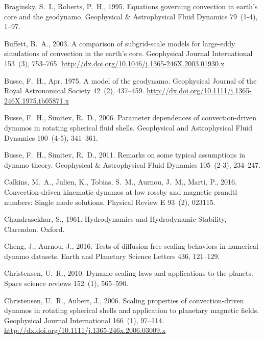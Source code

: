 \documentclass[12pt, a4paper]{article}
\begin{document}
\begin{thebibliography}{73}
Braginsky, S.~I., Roberts, P.~H., 1995. Equations governing convection in
  earth's core and the geodynamo. Geophysical \& Astrophysical Fluid Dynamics
  79~(1-4), 1--97.

Buffett, B.~A., 2003. A comparison of subgrid-scale models for large-eddy
  simulations of convection in the earth's core. Geophysical Journal
  International 153~(3), 753--765.
\newline\urlprefix\url{http://dx.doi.org/10.1046/j.1365-246X.2003.01930.x}

Busse, F.~H., Apr. 1975. A model of the geodynamo. Geophysical Journal of the
  Royal Astronomical Society 42~(2), 437--459.
\newline\urlprefix\url{http://dx.doi.org/10.1111/j.1365-246X.1975.tb05871.x}

Busse, F.~H., Simitev, R.~D., 2006. Parameter dependences of convection-driven
  dynamos in rotating spherical fluid shells. Geophysical and Astrophysical
  Fluid Dynamics 100~(4-5), 341--361.

Busse, F.~H., Simitev, R.~D., 2011. Remarks on some typical assumptions in
  dynamo theory. Geophysical \& Astrophysical Fluid Dynamics 105~(2-3),
  234--247.

Calkins, M.~A., Julien, K., Tobias, S.~M., Aurnou, J.~M., Marti, P., 2016.
  Convection-driven kinematic dynamos at low rossby and magnetic prandtl
  numbers: Single mode solutions. Physical Review E 93~(2), 023115.

Chandrasekhar, S., 1961. Hydrodynamics and Hydrodynamic Stability, Clarendon.
  Oxford.

Cheng, J., Aurnou, J., 2016. Tests of diffusion-free scaling behaviors in
  numerical dynamo datasets. Earth and Planetary Science Letters 436, 121--129.

Christensen, U.~R., 2010. Dynamo scaling laws and applications to the planets.
  Space science reviews 152~(1), 565--590.

Christensen, U.~R., Aubert, J., 2006. Scaling properties of convection-driven
  dynamos in rotating spherical shells and application to planetary magnetic
  fields. Geophysical Journal International 166~(1), 97--114.
\newline\urlprefix\url{http://dx.doi.org/10.1111/j.1365-246x.2006.03009.x}


\end{thebibliography}
\end{document}
